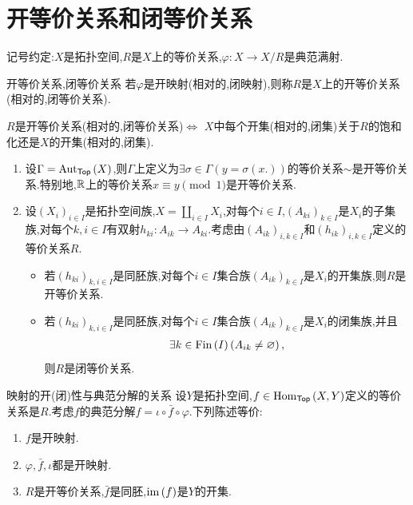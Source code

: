 \section{开等价关系和闭等价关系}

记号约定:$X$是拓扑空间,$R$是$X$上的等价关系,$\varphi:X\to X/R$是典范满射.

\begin{definition}{开等价关系,闭等价关系}{}
	若$\varphi$是开映射(相对的,闭映射),则称$R$是$X$上的开等价关系(相对的,闭等价关系).
\end{definition}

\begin{remark}{}{}
	$R$是开等价关系(相对的,闭等价关系)$\iff$ $X$中每个开集(相对的,闭集)关于$R$的饱和化还是$X$的开集(相对的,闭集).
\end{remark}

\begin{example}{}{}
	\begin{enumerate}
		\item 设$\Gamma=\operatorname{Aut}_{\mathsf{Top}}\left(X\right)$,则$\Gamma$上定义为$\exists\sigma\in\Gamma\left(y=\sigma\left(x.\right)\right)$的等价关系$\sim$是开等价关系.特别地,$\mathbb{R}$上的等价关系$x\equiv y\pmod{1}$是开等价关系.
		\item 设$\left(X_{i}\right)_{i\in I}$是拓扑空间族,$X=\coprod\limits_{i\in I}X_{i}$,对每个$i\in I$,$\left(A_{ki}\right)_{k\in I}$是$X_{i}$的子集族,对每个$k,i\in I$有双射$h_{ki}:A_{ik}\to A_{ki}$.考虑由$\left(A_{ik}\right)_{i,k\in I}$和$\left(h_{ik}\right)_{i,k\in I}$定义的等价关系$R$.
		\begin{itemize}
			\item 若$\left(h_{ki}\right)_{k,i\in I}$是同胚族,对每个$i\in I$集合族$\left(A_{ik}\right)_{k\in I}$是$X_{i}$的开集族,则$R$是开等价关系.
			\item 若$\left(h_{ki}\right)_{k,i\in I}$是同胚族,对每个$i\in I$集合族$\left(A_{ik}\right)_{k\in I}$是$X_{i}$的闭集族,并且
			\begin{align*}
				\exists k\in\operatorname{Fin}\left(I\right)\left(A_{ik}\neq\varnothing\right),
			\end{align*}
			则$R$是闭等价关系.
		\end{itemize}
	\end{enumerate}
\end{example}

\begin{proposition}{映射的开(闭)性与典范分解的关系}{}
	设$Y$是拓扑空间,$f\in\operatorname{Hom}_{\mathsf{Top}}\left(X,Y\right)$定义的等价关系是$R$.考虑$f$的典范分解$f=\iota\circ\bar{f}\circ\varphi$.下列陈述等价:
	\begin{enumerate}
		\item $f$是开映射.
		\item $\varphi,\bar{f},\iota$都是开映射.
		\item $R$是开等价关系,$\bar{f}$是同胚,$\operatorname{im}\left(f\right)$是$Y$的开集.
	\end{enumerate}
\end{proposition}

